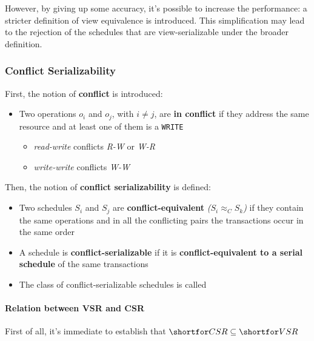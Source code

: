 \documentclass[english]{article}
\begin{document}
However, by giving up some accuracy, it's possible to increase the performance: a stricter definition of view equivalence is introduced.
This simplification may lead to the rejection of the schedules that are view-serializable under the broader definition.

\subsubsection{Conflict Serializability}

First, the notion of \textbf{conflict} is introduced:

\begin{itemize}
  \item Two operations \(o_i\) and \(o_j\), with \(i \neq j\), are \textbf{in conflict} if they address the same resource and at least one of them is a \texttt{WRITE}
        \begin{itemize}
          \item \textit{read-write} conflicts \textit{R-W} or \textit{W-R}
          \item \textit{write-write} conflicts \textit{W-W}
        \end{itemize}
\end{itemize}

Then, the notion of \textbf{conflict serializability} is defined:

\begin{itemize}
  \item Two schedules \(S_i\) and \(S_j\) are \textbf{conflict-equivalent} \textit{(\(S_i \approx_C S_k\))} if they contain the same operations and in all the conflicting pairs the transactions occur in the same order
  \item A schedule is \textbf{conflict-serializable} if it is \textbf{conflict-equivalent to a serial schedule} of the same transactions
  \item The class of conflict-serializable schedules is called \textbf{\csr}
\end{itemize}

\paragraph{Relation between VSR and CSR}

First of all, it's immediate to establish that \(\csr \subseteq \vsr\)
\end{document}
